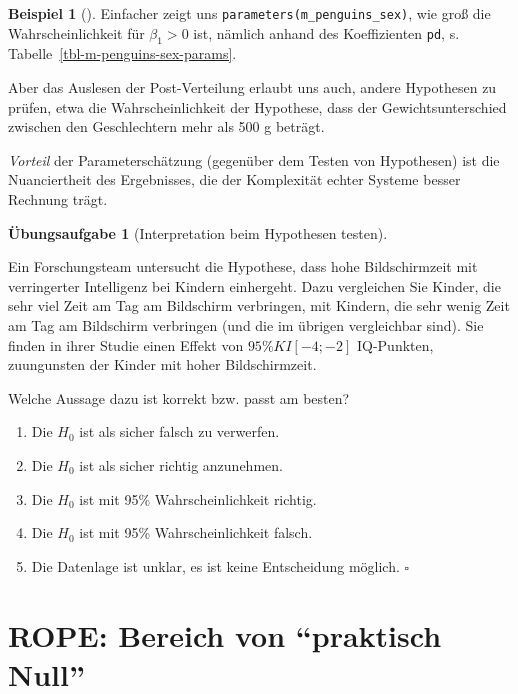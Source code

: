 \documentclass[
  ngerman,
  letterpaper,
  twoside,
  open=any]{scrbook}
\providecommand{\tightlist}{%
  \setlength{\itemsep}{0pt}\setlength{\parskip}{0pt}}\usepackage{longtable,booktabs,array}
\theoremstyle{definition}
\newtheorem{example}{Beispiel}[chapter]
\theoremstyle{plain}
\theoremstyle{definition}
\newtheorem{exercise}{Übungsaufgabe}[chapter]
\theoremstyle{definition}
\theoremstyle{remark}
\begin{document}
\begin{example}[]
Einfacher zeigt uns \texttt{parameters(m\_penguins\_sex)}, wie groß die
Wahrscheinlichkeit für \(\beta_1 > 0\) ist, nämlich anhand des
Koeffizienten \texttt{pd}, s. Tabelle~\ref{tbl-m-penguins-sex-params}.

Aber das Auslesen der Post-Verteilung erlaubt uns auch, andere
Hypothesen zu prüfen, etwa die Wahrscheinlichkeit der Hypothese, dass
der Gewichtsunterschied zwischen den Geschlechtern mehr als 500 g
beträgt.

\emph{Vorteil} der Parameterschätzung (gegenüber dem Testen von
Hypothesen) ist die Nuanciertheit des Ergebnisses, die der Komplexität
echter Systeme besser Rechnung trägt.

\begin{exercise}[Interpretation beim Hypothesen
testen]\protect\hypertarget{exr-peer-Interpretation-Hyp-testen}{}\label{exr-peer-Interpretation-Hyp-testen}

Ein Forschungsteam untersucht die Hypothese, dass hohe Bildschirmzeit
mit verringerter Intelligenz bei Kindern einhergeht. Dazu vergleichen
Sie Kinder, die sehr viel Zeit am Tag am Bildschirm verbringen, mit
Kindern, die sehr wenig Zeit am Tag am Bildschirm verbringen (und die im
übrigen vergleichbar sind). Sie finden in ihrer Studie einen Effekt von
\(95\% KI[-4;-2]\) IQ-Punkten, zuungunsten der Kinder mit hoher
Bildschirmzeit.

Welche Aussage dazu ist korrekt bzw. passt am besten?

\begin{enumerate}
\def\labelenumi{\Alph{enumi})}
\tightlist
\item
  Die \(H_0\) ist als sicher falsch zu verwerfen.
\item
  Die \(H_0\) ist als sicher richtig anzunehmen.
\item
  Die \(H_0\) ist mit 95\% Wahrscheinlichkeit richtig.
\item
  Die \(H_0\) ist mit 95\% Wahrscheinlichkeit falsch.
\item
  Die Datenlage ist unklar, es ist keine Entscheidung möglich.
  \(\square\)
\end{enumerate}

\end{exercise}

\section{\texorpdfstring{ROPE: Bereich von \enquote{praktisch
Null}}{ROPE: Bereich von ``praktisch Null''}}\label{sec-rope}


\end{example}
\end{document}
